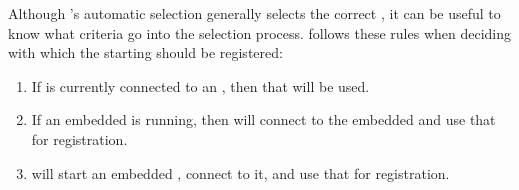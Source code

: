 Although \app{}'s automatic \gdagent{} selection generally selects the correct
\gdagent{}, it can be useful to know what criteria go into the selection 
process. \app{} follows these rules when deciding with which \gdagent{} the 
starting \gdaut{} should be registered:
\begin{enumerate}
\item{If \app{} is currently connected to an \gdagent{}, then that 
	  \gdagent{} will be used.}
\item{If an embedded \gdagent{} is running, then \app{} will connect to the embedded \gdagent{} and use that for \gdaut{} registration.}
\item{\app{} will start an embedded \gdagent{}, connect to it, and use that for \gdaut{} registration.}
\end{enumerate}
